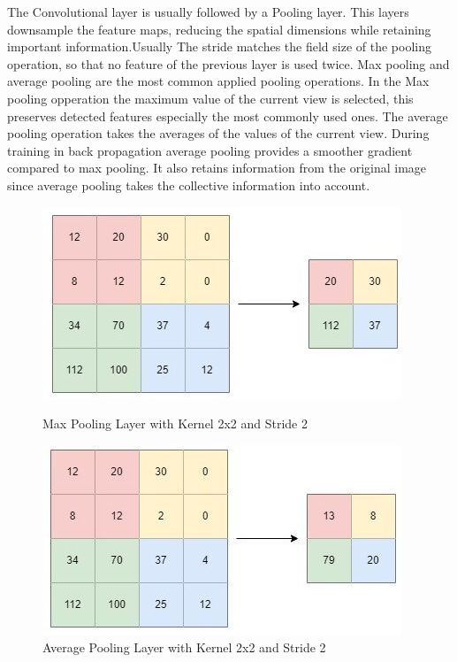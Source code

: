 \documentclass[
a4paper, 
12pt,
grayscalebody, %
abstract=on,
twoside, BCOR10mm, 12pt, DIV13,headinclude, footexclude, final, abstracton, openright
]{ibireprt}
\numberwithin{equation}{chapter}
\numberwithin{table}{chapter}
\numberwithin{figure}{chapter}
\numberwithin{algorithm}{chapter}
\numberwithin{example}{chapter}
\numberwithin{example}{chapter}
\begin{document}
The Convolutional layer is usually followed by a Pooling layer. This  layers downsample the feature maps, reducing the spatial dimensions while retaining important information.Usually The stride matches the field size of the pooling operation, so that no feature of the previous layer is used twice. Max pooling and average pooling are the most common applied pooling operations. In the Max pooling opperation the maximum value of the current view is selected, this preserves detected features especially the most commonly used ones. The average pooling operation takes the averages of the values of the current view. During training in back propagation average pooling provides a smoother gradient compared to max pooling. It also retains information from the original image since average pooling takes the collective information into account. \\ %
\begin{figure}[h]
	\centering
	\begin{minipage}[t]{.45\linewidth}
		\centering
		\includegraphics[width = \textwidth]{MaxPooling.jpg}%
		\caption{Max Pooling Layer with Kernel 2x2 and Stride 2}
		\label{fig:fig_max_pooling}
		
	\end{minipage}
	\hfill
	\begin{minipage}[t]{.45\linewidth}
		\centering
		\includegraphics[width = \textwidth]{Average_Pooling.jpg}%
		\caption{Average Pooling Layer with Kernel 2x2 and Stride 2}
		\label{fig:fig_average_pooling}
	\end{minipage}
\end{figure}
\end{document}
